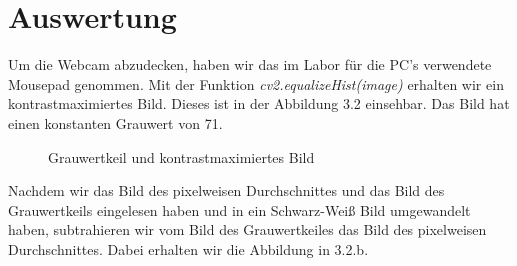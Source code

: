 \documentclass[12pt, oneside, a4paper, \docLanguage]{report}
\begin{document}
\section{Auswertung}
\label{chap:VERSUCH_2_AUSWERTUNG}
Um die Webcam abzudecken, haben wir das im Labor für die PC's verwendete Mousepad genommen.
Mit der Funktion \textit{cv2.equalizeHist(image)} erhalten wir ein kontrastmaximiertes Bild. Dieses ist in der Abbildung 3.2 einsehbar.
Das Bild hat einen konstanten Grauwert von 71.
\begin{figure}[hbt!]
	\centering
	\hfill
	\caption{Grauwertkeil und kontrastmaximiertes Bild}
\end{figure}

Nachdem wir das Bild des pixelweisen Durchschnittes und das Bild des Grauwertkeils eingelesen haben und in ein Schwarz-Weiß Bild umgewandelt haben, subtrahieren wir vom Bild des Grauwertkeiles das Bild des pixelweisen Durchschnittes.
Dabei erhalten wir die Abbildung in 3.2.b.
\end{document}
